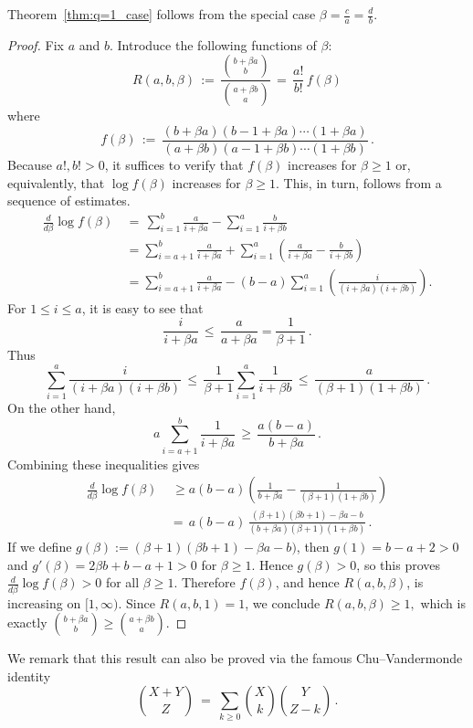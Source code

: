 \documentclass[11pt]{amsart}
\begin{document}
Theorem~\ref{thm:q=1_case} follows from the special case $\beta=\frac{c}a=\frac{d}b$.

\begin{proof} Fix $a$ and $b$. Introduce the following functions of $\beta$: 
\[
R(a,b,\beta)
\, := \, \frac{\binom{b+\beta a}b}{\binom{a+\beta b}a}
\,  = \, \frac{a!}{b!}\, f(\beta)
\]
where
$$f(\beta) \, := \, \frac{(b+\beta a)(b-1+\beta a)\cdots(1+\beta a)}{(a+\beta b)(a-1+\beta b)\cdots (1+\beta b)} \, .$$
Because $a!, b!>0$, it suffices to verify that $f(\beta)$
increases for $\beta\geq1$ or, equivalently, that $\log f(\beta)$ increases for $\beta\geq1$. 
This, in turn, follows from a sequence of estimates.
\begin{align*}
\frac{d}{d\beta}\log f(\beta) 
\, &= \, \sum_{i=1}^b\frac{a} {i+\beta a}-\sum_{i=1}^a\frac{b} {i+\beta b} \\
 & = \sum_{i=a+1}^b \frac{a} {i+\beta a} + \sum_{i=1}^a\left(\frac{a} {i+\beta a}-\frac{b} {i+\beta b}\right)  \\
  &= \sum_{i=a+1}^b \frac{a} {i+\beta a}
 - (b-a)\sum_{i=1}^a\left(\frac{i}{(i+\beta a)(i+\beta b)}\right).
\end{align*}
For $1\le i\le a$, it is easy to see that
$$\frac{i}{i+\beta a} \, \leq \, \frac{a}{a+\beta a}=\frac1{\beta+1} \, .$$
Thus
$$\sum_{i=1}^a\frac{i}{(i+\beta a)(i+\beta b)}
 \, \leq \, \frac1{\beta+1}\sum_{i=1}^a \frac1{i+\beta b}
 \, \leq \, \frac{a}{(\beta+1)(1+\beta b)} \, .$$
On the other hand, %
$$a\sum_{i=a+1}^{b}\frac{1}{i+\beta a} \, \ge \, \frac{a(b-a)}{b+\beta a} \, .$$
Combining these inequalities gives
\begin{align*}
\frac{d}{d\beta}\log f(\beta)
\, & \, \ge a(b-a)\left(\frac{1}{b+\beta a}-\frac{1}{(\beta+1)(1+\beta b)}\right) \\
&= \, a(b-a)\, \frac{(\beta+1)(\beta b+1)-\beta a-b}{(b+\beta a)(\beta+1)(1+\beta b)}\, . 
\end{align*}
If we define $g(\beta):=(\beta+1)(\beta b+1)-\beta a-b)$, then
$g(1)=b-a+2>0$ and $g'(\beta)=2\beta b+b-a+1>0$
for $\beta\ge 1$. Hence $g(\beta)>0$, so this proves
$\frac{d}{d\beta}\log f(\beta)>0$
for all $\beta\ge 1$. Therefore $f(\beta)$, and hence $R(a,b,\beta)$, is increasing on $[1,\infty)$. Since $R(a,b,1)=1$, we conclude
$R(a,b,\beta)\ge 1,$ which is exactly $\binom{b+\beta a}{b}\ge \binom{a+\beta b}{a}$.
\end{proof}

We remark that this result can also be proved via the famous Chu--Vandermonde identity~\cite[(5.22)]{GKP}
$$\binom{X+Y}Z \ = \ \sum_{k\geq0} \binom{X}k\binom{Y}{Z-k} \, .$$
\end{document}
